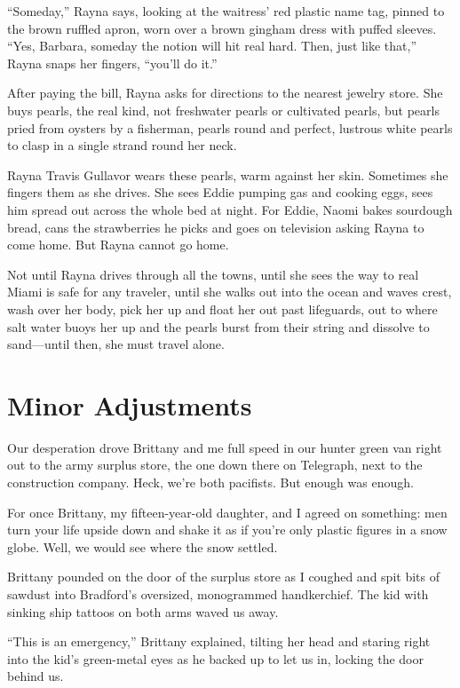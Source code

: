\documentclass[twoside,10pt]{book}
\begin{document}
``Someday,'' Rayna says, looking at the waitress' red plastic name tag,
pinned to the brown ruf­fled apron, worn over a brown gingham dress with
puffed sleeves. ``Yes, Barbara, someday the notion will hit real hard.
Then, just like that,'' Rayna snaps her fingers, ``you'll do it.''

After paying the bill, Rayna asks for directions to the nearest jewelry
store. She buys pearls, the real kind, not freshwater pearls or
cultivated pearls, but pearls pried from oysters by a fisherman, pearls
round and perfect, lustrous white pearls to clasp in a single strand
round her neck.

Rayna Travis Gullavor wears these pearls, warm against her skin.
Sometimes she fingers them as she drives. She sees Eddie pumping gas and
cooking eggs, sees him spread out across the whole bed at night. For
Eddie, Naomi bakes sourdough bread, cans the strawberries he picks and
goes on televi­sion asking Rayna to come home. But Rayna cannot go home.

Not until Rayna drives through all the towns, until she sees the way to
real Miami is safe for any traveler, until she walks out into the ocean
and waves crest, wash over her body, pick her up and float her out past
lifeguards, out to where salt water buoys her up and the pearls burst
from their string and dissolve to sand---until then, she must travel
alone.



\cleardoublepage
\chapter{Minor Adjustments}

Our desperation drove Brittany and me full speed in our hunter green van
right out to the army surplus store, the one down there on Telegraph,
next to the construction company. Heck, we're both pacifists. But enough
was enough.

For once Brittany, my fifteen-year-old daughter, and I agreed on
something: men turn your life up­side down and shake it as if you're
only plastic figures in a snow globe. Well, we would see where the snow
settled.

Brittany pounded on the door of the surplus store as I coughed and spit
bits of sawdust into Bradford's oversized, monogrammed handkerchief. The
kid with sinking ship tattoos on both arms waved us away.

``This is an emergency,'' Brittany explained, tilting her head and
staring right into the kid's green-metal eyes as he backed up to let us
in, locking the door behind us.
\end{document}
